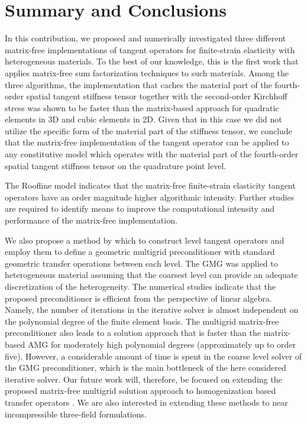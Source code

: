 \documentclass[times,doublespace]{nmeauth}
\begin{document}
\section{Summary and Conclusions}
\label{sec:summary}

In this contribution, we proposed and numerically investigated {\color{red}three different} matrix-free implementations of tangent operators for finite-strain elasticity with heterogeneous materials.
{\color{red}
To the best of our knowledge, this is the first work that applies matrix-free sum factorization techniques to such materials.}
{\color{red}Among the three algorithms,}
the implementation that caches the material part of the fourth-order spatial tangent stiffness tensor together with the second-order Kirchhoff stress was shown to be faster than the matrix-based approach for quadratic elements in 3D and cubic {\color{red}elements in 2D}.
{\color{red}
Given that in this case we did not utilize the specific form of the material part of the stiffness tensor, we conclude}
that the matrix-free implementation of the tangent operator can be applied to any constitutive model which operates with the material part of the fourth-order spatial tangent stiffness tensor on the quadrature point level.

{\color{red}
The Roofline model indicates that the matrix-free finite-strain elasticity tangent operators have an order magnitude higher algorithmic intensity. Further studies are required to identify means to improve the computational intensity and performance of the matrix-free implementation.}

{\color{red}
We also propose a method by which to construct level tangent operators and employ them to define a geometric multigrid preconditioner
}
with standard geometric transfer operations between each level.
The GMG was applied to heterogeneous material assuming that the coarsest level can provide an adequate discretization of the heterogeneity.
The numerical studies indicate that the proposed preconditioner is efficient from the perspective of linear algebra.
{\color{red}
Namely, the number of iterations in the iterative solver is almost independent on the polynomial degree of the finite element basis.
The multigrid matrix-free preconditioner also}
leads to a solution approach that is faster than the matrix-based AMG for moderately high polynomial degrees (approximately up to order five).
However, a considerable amount of time is spent in the coarse level solver of the GMG preconditioner,
{\color{red}
which is the main bottleneck of the here considered iterative solver.}
Our future work will, therefore, be focused on extending the proposed matrix-free multigrid solution approach to homogenization based transfer operators \cite{Miehe2007}.
We are also interested in extending these methods to near incompressible three-field formulations.
\end{document}
